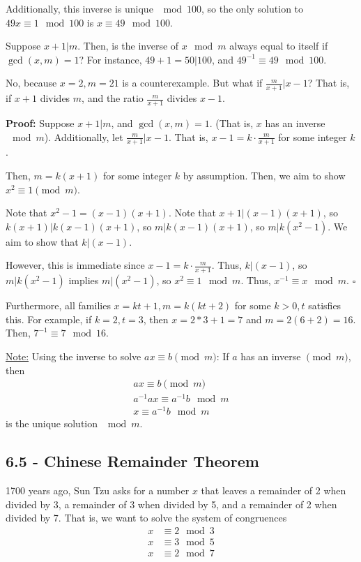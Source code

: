 \documentclass{article}
\newcommand*{\qed}{\hfill$\square$}%
\newenvironment{aside}{\begin{siderules}\setlength{\leftskip}{0.3cm}}{\end{siderules}\setlength{\leftskip}{0pt}}
\begin{document}
Additionally, this inverse is unique $\mod 100$, so the only solution to $49x\equiv 1\mod 100$ is $x\equiv 49\mod 100$.

\begin{aside}
Suppose $x+1|m$. Then, is the inverse of $x\mod m$ always equal to itself if $\gcd(x,m)=1$? For instance, $49+1=50|100$, and $49^{-1}\equiv 49\mod 100$.

No, because $x=2, m=21$ is a counterexample. But what if $\frac{m}{x+1}|x-1$? That is, if $x+1$ divides $m$, and the ratio $\frac{m}{x+1}$ divides $x-1$. 

\textbf{Proof:} Suppose $x+1|m$, and $\gcd(x,m)=1$. (That is, $x$ has an inverse $\mod m$). Additionally, let $\frac{m}{x+1}|x-1$. That is, $x-1=k\cdot \frac{m}{x+1}$ for some integer $k$.

Then, $m=k(x+1)$ for some integer $k$ by assumption. Then, we aim to show $x^2\equiv 1\pmod m$.

Note that $x^2-1=(x-1)(x+1)$. Note that $x+1|(x-1)(x+1)$, so $k(x+1)|k(x-1)(x+1)$, so $m|k(x-1)(x+1)$, so $m|k(x^2-1)$. We aim to show that $k|(x-1)$. 

However, this is immediate since $x-1=k\cdot \frac{m}{x+1}$. Thus, $k|(x-1)$, so $m|k(x^2-1)$ implies $m|(x^2-1)$, so $x^2\equiv 1\mod m$. Thus, $x^{-1}\equiv x\mod m$. \qed

Furthermore, all families $x=kt+1, m=k(kt+2)$ for some $k>0, t$ satisfies this. For example, if $k=2, t=3$, then $x=2*3+1=7$ and $m=2(6+2)=16$. Then, $7^{-1}\equiv 7\mod 16$.
\end{aside}

\underline{Note:} Using the inverse to solve $ax\equiv b\pmod m$: If $a$ has an inverse $\pmod m$, then \begin{align*}
    ax\equiv b\pmod m\\
    a^{-1}ax\equiv a^{-1}b\mod m\\
    x\equiv a^{-1}b\mod m
\end{align*}is the unique solution $\mod m$.

\subsection{6.5 - Chinese Remainder Theorem}

1700 years ago, Sun Tzu asks for a number $x$ that leaves a remainder of 2 when divided by 3, a remainder of 3 when divided by 5, and a remainder of 2 when divided by 7. That is, we want to solve the system of congruences \begin{align*}
    x&\equiv 2\mod 3\\
    x&\equiv 3\mod 5\\
    x&\equiv 2\mod 7
\end{align*}
\end{document}
